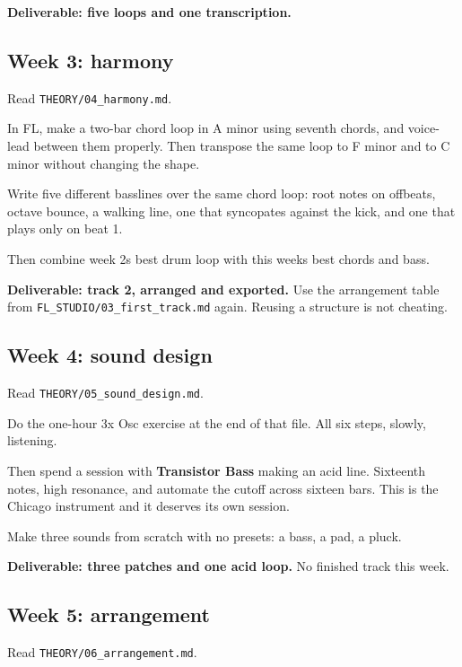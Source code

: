 \textbf{Deliverable: five loops and one transcription.}

\subsection{Week 3: harmony}\label{pr01_eight_weeks-week-3-harmony}

Read \texttt{THEORY/04\_harmony.md}.

In FL, make a two-bar chord loop in A minor using seventh chords, and voice-lead between
them properly. Then transpose the same loop to F minor and to C minor without changing the
shape.

Write five different basslines over the same chord loop: root notes on offbeats, octave
bounce, a walking line, one that syncopates against the kick, and one that plays only on
beat 1.

Then combine week 2\textquotesingle s best drum loop with this week\textquotesingle s best chords and bass.

\textbf{Deliverable: track 2, arranged and exported.} Use the arrangement table from
\texttt{FL\_STUDIO/03\_first\_track.md} again. Reusing a structure is not cheating.

\subsection{Week 4: sound design}\label{pr01_eight_weeks-week-4-sound-design}

Read \texttt{THEORY/05\_sound\_design.md}.

Do the one-hour 3x Osc exercise at the end of that file. All six steps, slowly, listening.

Then spend a session with \textbf{Transistor Bass} making an acid line. Sixteenth notes, high
resonance, and automate the cutoff across sixteen bars. This is the Chicago instrument and
it deserves its own session.

Make three sounds from scratch with no presets: a bass, a pad, a pluck.

\textbf{Deliverable: three patches and one acid loop.} No finished track this week.

\subsection{Week 5: arrangement}\label{pr01_eight_weeks-week-5-arrangement}

Read \texttt{THEORY/06\_arrangement.md}.

